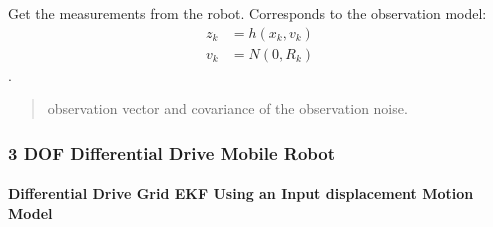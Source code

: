 \documentclass[letterpaper,10pt,english]{sphinxmanual}
\begin{document}
\begin{fulllineitems}
\begin{fulllineitems}
\label{\detokenize{GFLocalization:EKF_4DOFAUV_CtVelocityMM_DVLDepthYawOM.EKF_4DOFAUV_CtVelocityMM_DVLDepthYawOM.GetMeasurements}}
\pysigstartsignatures
{}
\pysigstopsignatures
\sphinxAtStartPar
Get the measurements from the robot. Corresponds to the observation model:
\begin{equation}\label{equation:GFLocalization:eq-h}
\begin{split}z_k &= h(x_{k},v_k) \\
v_k &= N(0,R_k)\end{split}
\end{equation}
\sphinxAtStartPar
{} .
\begin{quote}\begin{description}
\sphinxAtStartPar
observation vector and covariance of the observation noise.

\end{description}\end{quote}

\end{fulllineitems}


\end{fulllineitems}



\subsubsection{3 DOF Differential Drive Mobile Robot}
\label{\detokenize{GFLocalization:dof-differential-drive-mobile-robot}}

\paragraph{Differential Drive Grid EKF Using an Input displacement Motion Model}
\label{\detokenize{GFLocalization:differential-drive-grid-ekf-using-an-input-displacement-motion-model}}
\begin{figure}[htbp]
\centering

\noindent{}
\end{figure}
\end{document}
